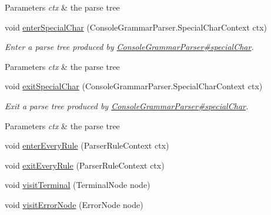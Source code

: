 \begin{DoxyCompactItemize}
\begin{DoxyCompactList}
\begin{DoxyParams}{Parameters}
{\em ctx} & the parse tree\\
\hline
\end{DoxyParams}
 \end{DoxyCompactList}\item 
void \hyperlink{classgov_1_1nasa_1_1jpf_1_1inspector_1_1client_1_1parser_1_1_console_grammar_base_listener_a211591bd700c00d61c10e8adb7e326ba}{enter\+Special\+Char} (Console\+Grammar\+Parser.\+Special\+Char\+Context ctx)
\begin{DoxyCompactList}\small\item\em Enter a parse tree produced by \hyperlink{classgov_1_1nasa_1_1jpf_1_1inspector_1_1client_1_1parser_1_1_console_grammar_parser_ade082ae679f41cefb41bcb42544f08e5}{Console\+Grammar\+Parser\#special\+Char}.


\begin{DoxyParams}{Parameters}
{\em ctx} & the parse tree\\
\hline
\end{DoxyParams}
 \end{DoxyCompactList}\item 
void \hyperlink{classgov_1_1nasa_1_1jpf_1_1inspector_1_1client_1_1parser_1_1_console_grammar_base_listener_a371aaa68ac83ef24be976092e139fc2c}{exit\+Special\+Char} (Console\+Grammar\+Parser.\+Special\+Char\+Context ctx)
\begin{DoxyCompactList}\small\item\em Exit a parse tree produced by \hyperlink{classgov_1_1nasa_1_1jpf_1_1inspector_1_1client_1_1parser_1_1_console_grammar_parser_ade082ae679f41cefb41bcb42544f08e5}{Console\+Grammar\+Parser\#special\+Char}.


\begin{DoxyParams}{Parameters}
{\em ctx} & the parse tree\\
\hline
\end{DoxyParams}
 \end{DoxyCompactList}\item 
void \hyperlink{classgov_1_1nasa_1_1jpf_1_1inspector_1_1client_1_1parser_1_1_console_grammar_base_listener_a06e47afffecb22342e456623f7b8d116}{enter\+Every\+Rule} (Parser\+Rule\+Context ctx)
\item 
void \hyperlink{classgov_1_1nasa_1_1jpf_1_1inspector_1_1client_1_1parser_1_1_console_grammar_base_listener_a4dc1a5b9d4afeb11069e3ce0a4b27927}{exit\+Every\+Rule} (Parser\+Rule\+Context ctx)
\item 
void \hyperlink{classgov_1_1nasa_1_1jpf_1_1inspector_1_1client_1_1parser_1_1_console_grammar_base_listener_a4e201d726b5ef0e80797f767af74b3fc}{visit\+Terminal} (Terminal\+Node node)
\item 
void \hyperlink{classgov_1_1nasa_1_1jpf_1_1inspector_1_1client_1_1parser_1_1_console_grammar_base_listener_a34c10f42a08677bd7edd66b402761fc4}{visit\+Error\+Node} (Error\+Node node)
\end{DoxyCompactItemize}


